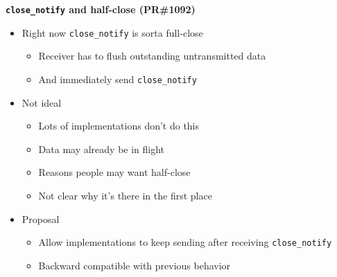 \documentclass[helvetica]{seminar}
\newcommand{\heading}[1]{%
  \begin{center} 
    \large\bf 
    #1 
  \end{center} 
  \vspace{.4 in}}
\begin{document}
\begin{slide}
\heading{\texttt{close\_notify} and half-close (PR\#1092)}

\vspace{-3ex}

\begin{itemize}
\item Right now \verb^close_notify^ is sorta full-close
  \begin{itemize}
  \item Receiver has to flush outstanding untransmitted data
  \item And immediately send \verb^close_notify^
  \end{itemize}

\item Not ideal
  \begin{itemize}
  \item Lots of implementations don't do this
  \item Data may already be in flight
  \item Reasons people may want half-close
  \item Not clear why it's there in the first place

  \end{itemize}

\item Proposal
  \begin{itemize}
  \item Allow implementations to keep sending after receiving \verb^close_notify^
  \item Backward compatible with previous behavior
  \end{itemize}
\end{itemize}
\end{slide}
\end{document}
